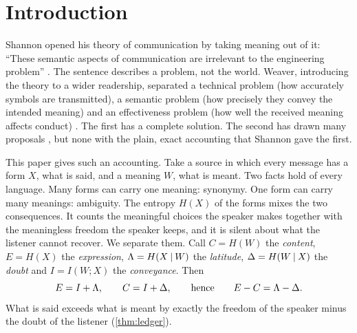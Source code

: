 \section{Introduction}\label{sec:intro}
Shannon opened his theory of communication by taking meaning out of it: ``These semantic aspects of communication are irrelevant to the engineering problem'' \citep{shannon1948}.
The sentence describes a problem, not the world. Weaver, introducing the theory to a wider readership, separated a technical problem (how accurately symbols are transmitted), a semantic problem (how precisely they convey the intended meaning) and an effectiveness problem (how well the received meaning affects conduct) \citep{weaver1949}.
The first has a complete solution. The second has drawn many proposals \citep{barhillel1953,floridi2011,bao2011,kolchinsky2018}, but none with the plain, exact accounting that Shannon gave the first.

This paper gives such an accounting. Take a source in which every message has a form $X$, what is said, and a meaning $W$, what is meant.
Two facts hold of every language. Many forms can carry one meaning: synonymy. One form can carry many meanings: ambiguity.
The entropy $H(X)$ of the forms mixes the two consequences. It counts the meaningful choices the speaker makes together with the meaningless freedom the speaker keeps, and it is silent about what the listener cannot recover.
We separate them. Call $C=H(W)$ the \emph{content}, $E=H(X)$ the \emph{expression}, $\Lambda=H(X\mathbin{\vert} W)$ the \emph{latitude}, $\Delta=H(W\mathbin{\vert} X)$ the \emph{doubt} and $I=I(W;X)$ the \emph{conveyance}. Then
\begin{equation*}
E=I+\Lambda,\qquad C=I+\Delta,\qquad\text{hence}\qquad E-C=\Lambda-\Delta .
\end{equation*}
What is said exceeds what is meant by exactly the freedom of the speaker minus the doubt of the listener (\cref{thm:ledger}).

